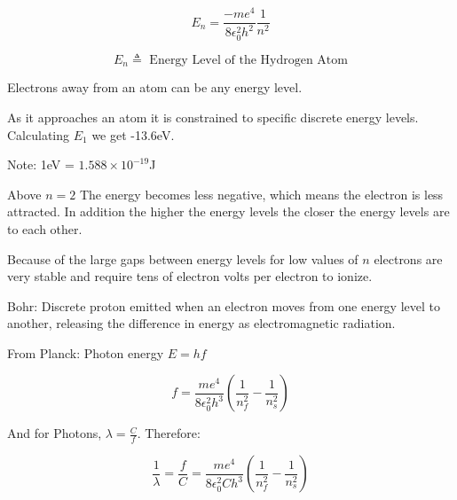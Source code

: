 \documentclass{report}
\begin{document}
\begin{description}
\begin{mdframed}
             \begin{displaymath}
                 E_n = \frac{-me^4}{8 \epsilon_0^2 h^2} \frac{1}{n^2}
             \end{displaymath}
             

             \begin{displaymath}
                E_n \triangleq \text{ Energy Level of the Hydrogen Atom}
             \end{displaymath}
             
             Electrons away from an atom can be any energy level.

             As it approaches an atom it is constrained to specific
             discrete energy levels. Calculating $E_1$ we get
             -13.6eV.

             \begin{mdframed}
                 Note: 1eV = $1.588\times 10^{-19}$J    
             \end{mdframed}
             
             Above $n = 2$ The energy becomes less negative, which means
             the electron is less attracted. In addition the higher
             the energy levels the closer the energy levels are to each other.

             Because of the large gaps between energy levels for low
             values of $n$ electrons are very stable and require
             tens of electron volts per electron to ionize.
        \end{mdframed}
        \pagebreak
        \begin{mdframed}
           Bohr: Discrete proton emitted when an electron moves
           from one energy level to another, releasing the difference
           in energy as electromagnetic radiation.

           From Planck: Photon energy $E = hf$

            \begin{displaymath}
                f = \frac{me^4}{8\epsilon_0^2 h^3} (\frac{1}{n_f^2} - \frac{1}{n_s^2})
           \end{displaymath}

           And for Photons, $\lambda = \frac{C}{f}$.
           Therefore:

           \begin{displaymath}
                \frac{1}{\lambda} = \frac{f}{C}
                = \frac{me^4}{8\epsilon_0^2 C h^3} (\frac{1}{n_f^2} - \frac{1}{n_s^2})
           \end{displaymath}
           

\end{mdframed}
\end{description}
\end{document}
